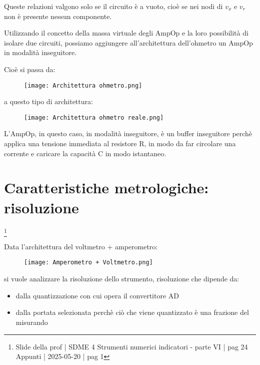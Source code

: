 Queste relazioni valgono solo se il circuito è a vuoto, cioè se nei nodi di $v_x$ e $v_r$ non è presente nessun componente. \newline 

Utilizzando il concetto della massa virtuale degli AmpOp e la loro possibilità di isolare due circuiti, 
possiamo aggiungere all'architettura dell'ohmetro un AmpOp in modalità inseguitore. \newline 

Cioè si passa da: 

\begin{figure}[h]
    \centering
    \texttt{[image: Architettura ohmetro.png]}
\end{figure}

a questo tipo di architettura: 

\begin{figure}[h]
    \centering
    \texttt{[image: Architettura ohmetro reale.png]}
\end{figure}

L'AmpOp, in questo caso, in modalità inseguitore, è un buffer inseguitore perchè applica una tensione immediata al resistore R, 
in modo da far circolare una corrente e caricare la capacità C in modo istantaneo. \newline

\newpage 

\section{Caratteristiche metrologiche: risoluzione}
\footnote{Slide della prof | SDME 4 Strumenti numerici indicatori - parte VI | pag 24 \\  
Appunti | 2025-05-20 | pag 1}

Data l'architettura del voltmetro + amperometro: 

\begin{figure}[h]
    \centering
    \texttt{[image: Amperometro + Voltmetro.png]}
\end{figure}

si vuole analizzare la risoluzione dello strumento, risoluzione che dipende da: 

\begin{itemize}
    \item dalla quantizzazione con cui opera il convertitore AD 
    \item dalla portata selezionata perchè ciò che viene quantizzato è una frazione del misurando 
\end{itemize}

